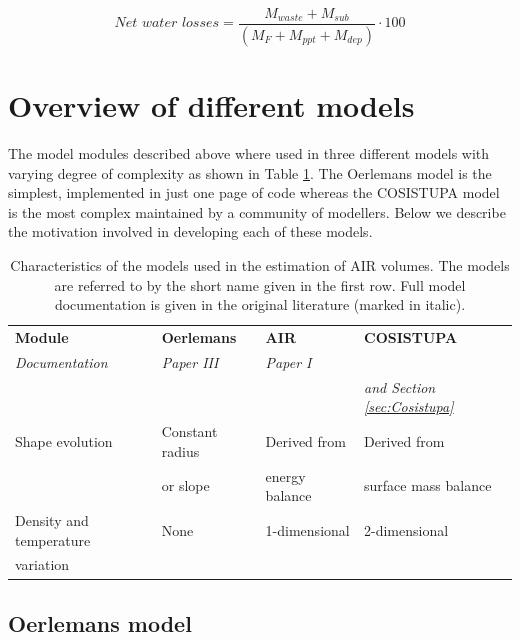 \begin{equation} \textit{Net water losses} = \frac{M_{waste}+M_{sub}}{(M_F+M_{ppt}+M_{dep})} \cdot 100 \end{equation}

\section{Overview of different models}
\label{sec:MIP}

The model modules described above where used in three different models with varying degree of complexity as
shown in Table \ref{tab:MIP}. The Oerlemans model is the simplest, implemented in just one page of code whereas
the COSISTUPA model is the most complex maintained by a community of modellers.  Below we describe the
motivation involved in developing each of these models.

\begin{table}[ht]
	\centering
  \caption{Characteristics of the models used in the estimation of AIR volumes. The models are referred to by
  the short name given in the first row. Full model documentation is given in the original literature (marked in
  italic). }      

	\label{tab:MIP}
	\begin{tabular}{|llll|}
		\hline
		\textbf{Module}        & \textbf{Oerlemans} & \textbf{AIR} & \textbf{COSISTUPA}     \\ 
		\textit{Documentation} & \textit{Paper III} & \textit{Paper I} & \textit{\citet{sauterCOSIPYV1Opensource2020}} \\ 
		                       &                    &                  & \textit{and Section \ref{sec:Cosistupa}}     \\ \hline
		Shape evolution        & Constant radius     & Derived from  & Derived from        \\
                           & or slope            & energy balance & surface mass balance        \\\hline
		Density and temperature& None & 1-dimensional   & 2-dimensional   \\
		variation              &           &        & \\ \hline
	\end{tabular}
\end{table}

\subsection{Oerlemans model}

